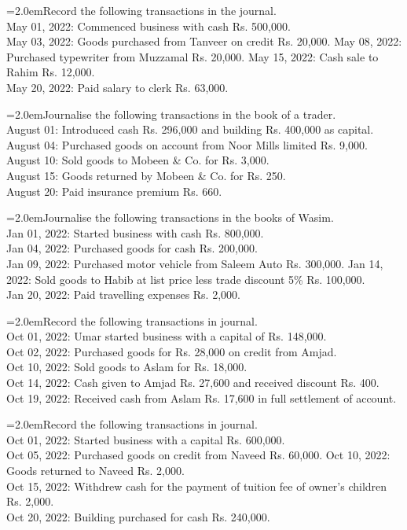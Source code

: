 \documentclass[11pt,a4paper]{article}
\newcommand{\lqn}[2]{\Needspace{6\baselineskip}\par\medskip\noindent\hangindent=2.0em\hangafter=1\makebox[2.0em][l]{\textbf{#1.}}#2\par}
\begin{document}
\lqn{11}{Record the following transactions in the journal.\\
May 01, 2022:   Commenced business with cash Rs. 500,000.\\
May 03, 2022:   Goods purchased from Tanveer on credit Rs. 20,000. May 08, 2022:   Purchased typewriter from Muzzamal Rs. 20,000. May 15, 2022:   Cash sale to Rahim Rs. 12,000.\\
May 20, 2022:   Paid salary to clerk Rs. 63,000.\par
}
\lqn{12}{Journalise the following transactions in the book of a trader.\\
August 01:        Introduced cash Rs. 296,000 and building Rs. 400,000 as capital.\\
August 04:        Purchased goods on account from Noor Mills limited Rs. 9,000.\\
August 10:        Sold goods to Mobeen \& Co. for Rs. 3,000.\\
August 15:        Goods returned by Mobeen \& Co. for Rs. 250.\\
August 20:        Paid insurance premium Rs. 660.\par
}
\lqn{13}{Journalise the following transactions in the books of Wasim.\\
Jan 01, 2022:    Started business with cash Rs. 800,000.\\
Jan 04, 2022:    Purchased goods for cash Rs. 200,000.\\
Jan 09, 2022:    Purchased motor vehicle from Saleem Auto Rs. 300,000. Jan 14, 2022:    Sold goods to Habib at list price less trade discount 5\% Rs. 100,000.\\
Jan 20, 2022:    Paid travelling expenses Rs. 2,000.\par
}
\lqn{14}{Record the following transactions in journal.\\
Oct 01, 2022:    Umar started business with a capital of Rs. 148,000.\\
Oct 02, 2022:    Purchased goods for Rs. 28,000 on credit from Amjad.\\
Oct 10, 2022:    Sold goods to Aslam for Rs. 18,000.\\
Oct 14, 2022:    Cash given to Amjad Rs. 27,600 and received discount Rs. 400.\\
Oct 19, 2022:    Received cash from Aslam Rs. 17,600 in full settlement of account.\par
}
\lqn{15}{Record the following transactions in journal.\\
Oct 01, 2022:    Started business with a capital Rs. 600,000.\\
Oct 05, 2022:    Purchased goods on credit from Naveed Rs. 60,000. Oct 10, 2022:    Goods returned to Naveed Rs. 2,000.\\
Oct 15, 2022:    Withdrew cash for the payment of tuition fee of owner’s children Rs. 2,000.\\
Oct 20, 2022:    Building purchased for cash Rs. 240,000.\par
}
\end{document}
